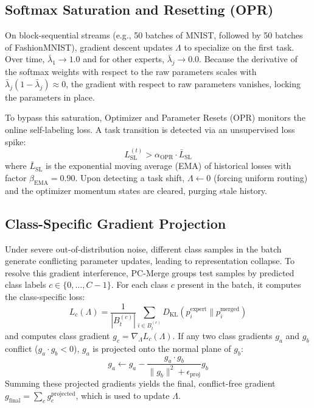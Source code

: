 \documentclass{article}
\theoremstyle{plain}
\theoremstyle{definition}
\theoremstyle{remark}
\begin{document}
\subsection{Softmax Saturation and Resetting (OPR)}
On block-sequential streams (e.g., 50 batches of MNIST, followed by 50 batches of FashionMNIST), gradient descent updates $\Lambda$ to specialize on the first task. Over time, $\bar{\lambda}_1 \rightarrow 1.0$ and for other experts, $\bar{\lambda}_j \rightarrow 0.0$. Because the derivative of the softmax weights with respect to the raw parameters scales with $\bar{\lambda}_j(1 - \bar{\lambda}_j) \approx 0$, the gradient with respect to raw parameters vanishes, locking the parameters in place.

To bypass this saturation, Optimizer and Parameter Resets (OPR) \cite{pc_merge} monitors the online self-labeling loss. A task transition is detected via an unsupervised loss spike:
\begin{equation}
    L_{\text{SL}}^{(t)} > \alpha_{\text{OPR}} \cdot \bar{L}_{\text{SL}}
\end{equation}
where $\bar{L}_{\text{SL}}$ is the exponential moving average (EMA) of historical losses with factor $\beta_{\text{EMA}} = 0.90$. Upon detecting a task shift, $\Lambda \leftarrow 0$ (forcing uniform routing) and the optimizer momentum states are cleared, purging stale history.

\subsection{Class-Specific Gradient Projection}
Under severe out-of-distribution noise, different class samples in the batch generate conflicting parameter updates, leading to representation collapse. To resolve this gradient interference, PC-Merge groups test samples by predicted class labels $c \in \{0, \dots, C-1\}$. For each class $c$ present in the batch, it computes the class-specific loss:
\begin{equation}
    L_c(\Lambda) = \frac{1}{|B_t^{(c)}|} \sum_{i \in B_t^{(c)}} D_{\text{KL}}(p_i^{\text{expert}} \parallel p_i^{\text{merged}})
\end{equation}
and computes class gradient $g_c = \nabla_{\Lambda} L_c(\Lambda)$. If any two class gradients $g_a$ and $g_b$ conflict ($g_a \cdot g_b < 0$), $g_a$ is projected onto the normal plane of $g_b$:
\begin{equation}
    g_a \leftarrow g_a - \frac{g_a \cdot g_b}{\|g_b\|^2 + \epsilon_{\text{proj}}} g_b
\end{equation}
Summing these projected gradients yields the final, conflict-free gradient $g_{\text{final}} = \sum_c g_c^{\text{projected}}$, which is used to update $\Lambda$.
\end{document}
